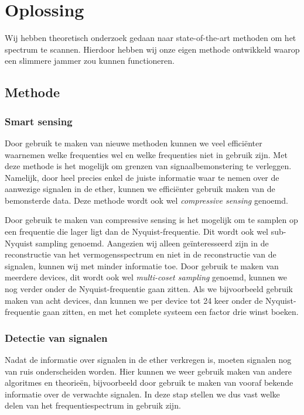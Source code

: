 \documentclass[oneside, a4paper, openany]{memoir}
\begin{document}
\chapter{Oplossing}
Wij hebben theoretisch onderzoek gedaan naar state-of-the-art methoden om het spectrum te scannen. Hierdoor hebben wij onze eigen methode ontwikkeld waarop een slimmere jammer zou kunnen functioneren.


\section{Methode}
\subsection{Smart sensing}
Door gebruik te maken van nieuwe methoden kunnen we veel efficiënter waarnemen welke frequenties wel en welke frequenties niet in gebruik zijn. Met deze methode is het mogelijk om grenzen van signaalbemonstering te verleggen. Namelijk, door heel precies enkel de juiste informatie waar te nemen over de aanwezige signalen in de ether, kunnen we efficiënter gebruik maken van de bemonsterde data. Deze methode wordt ook wel \textit{compressive sensing} genoemd.

\begin{blockDetail}
Door gebruik te maken van compressive sensing is het mogelijk om te samplen op een frequentie die lager ligt dan de Nyquist-frequentie. Dit wordt ook wel sub-Nyquist sampling genoemd. Aangezien wij alleen geïnteresseerd zijn in de reconstructie van het vermogensspectrum en niet in de reconstructie van de signalen, kunnen wij met minder informatie toe. Door gebruik te maken van meerdere devices, dit wordt ook wel \textit{multi-coset sampling} genoemd, kunnen we nog verder onder de Nyquist-frequentie gaan zitten. Als we bijvoorbeeld gebruik maken van acht devices, dan kunnen we per device tot 24 keer onder de Nyquist-frequentie gaan zitten, en met het complete systeem een factor drie winst boeken. \cite{ariananda2011multicoset} \cite{ariananda2012compressive}
\end{blockDetail}

\subsection{Detectie van signalen}
Nadat de informatie over signalen in de ether verkregen is, moeten signalen nog van ruis onderscheiden worden. Hier kunnen we weer gebruik maken van andere algoritmes en theorieën, bijvoorbeeld door gebruik te maken van vooraf bekende informatie over de verwachte signalen. In deze stap stellen we dus vast welke delen van het frequentiespectrum in gebruik zijn.
\end{document}
